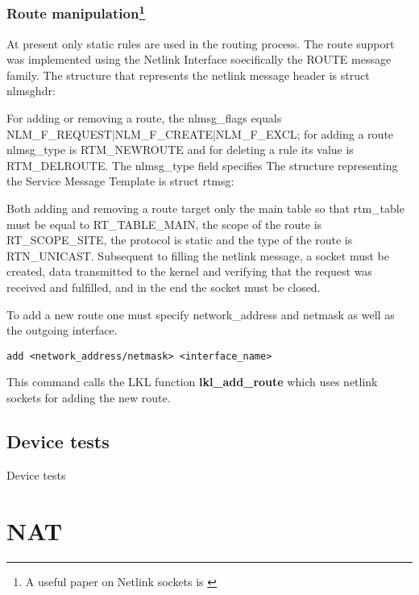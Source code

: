 {{\subsubsection[Route manipulation]{Route manipulation\footnote{A useful paper on Netlink sockets is \cite{netlinksockets}}}
At present only static rules are used in the routing process.
The route support was implemented using the Netlink Interface soecifically the ROUTE message family.
The structure that represents the netlink message header is struct nlmsghdr:
\lstset{language=C, caption=Netlink Message Header Structure}

For adding or removing a route, the nlmsg_flags equals NLM_F_REQUEST|NLM_F_CREATE|NLM_F_EXCL; for adding a route nlmsg_type is RTM_NEWROUTE and for deleting a rule its value is RTM_DELROUTE.
The nlmsg_type field specifies 
The structure representing the Service Message Template is struct rtmsg:
\lstset{language=C, caption=Service Message Template Structure}

Both adding and removing a route target only the main table so that rtm_table must be equal to RT_TABLE_MAIN, the scope of the route is RT_SCOPE_SITE, the protocol is static and the type of the route is RTN_UNICAST.
Subsequent to filling the netlink message, a socket must be created, data transmitted to the kernel and verifying that the request was received and fulfilled, and in the end the socket must be closed.
\lstset{language=C, caption=Communicating with the kernel}
  

To add a new route one must specify network_address and netmask as well as the outgoing interface.
\lstset{language=zsh,caption=Adding a new interface,label=lst:saddrule}
\begin{lstlisting}
add <network_address/netmask> <interface_name> 
\end{lstlisting}  
This command calls the LKL function {\bf lkl_add_route} which uses netlink sockets for adding the new route.

\subsection{Device tests}
\label{sub-sec:router-tests}

Device tests

\section{NAT}
\label{sub-sec:nat-impl}

}}
